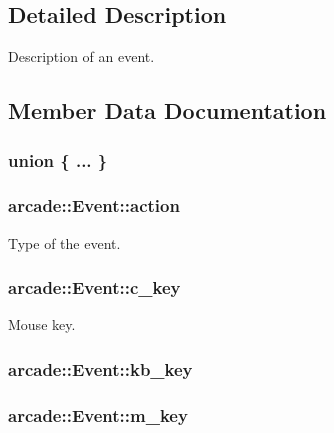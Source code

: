 \subsection{Detailed Description}
Description of an event. 

\subsection{Member Data Documentation}
\hypertarget{structarcade_1_1_event_af7239e1001b65e42e8943daebf9188a2}{\subsubsection[{"@3}]{\setlength{\rightskip}{0pt plus 5cm}union \{ ... \} }}\label{structarcade_1_1_event_af7239e1001b65e42e8943daebf9188a2}
\hypertarget{structarcade_1_1_event_a4c0d22bb440a9185fe94b9a66759823c}{
\subsubsection[{action}]{ arcade\-::\-Event\-::action}}\label{structarcade_1_1_event_a4c0d22bb440a9185fe94b9a66759823c}


Type of the event. 

\hypertarget{structarcade_1_1_event_a9d837c85701594ddda4d04dc5b1d8a39}{
\subsubsection[{c\-\_\-key}]{ arcade\-::\-Event\-::c\-\_\-key}}\label{structarcade_1_1_event_a9d837c85701594ddda4d04dc5b1d8a39}


Mouse key. 

\hypertarget{structarcade_1_1_event_aa6cca034ec9c2c6b3d9078e8a0ce8700}{
\subsubsection[{kb\-\_\-key}]{ arcade\-::\-Event\-::kb\-\_\-key}}\label{structarcade_1_1_event_aa6cca034ec9c2c6b3d9078e8a0ce8700}
\hypertarget{structarcade_1_1_event_a52ed03f8b18613ade5ce903d36762f32}{
\subsubsection[{m\-\_\-key}]{ arcade\-::\-Event\-::m\-\_\-key}}\label{structarcade_1_1_event_a52ed03f8b18613ade5ce903d36762f32}


